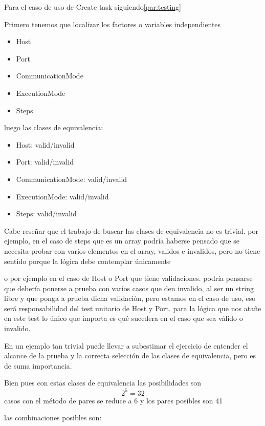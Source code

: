 Para el caso de uso de Create task siguiendo\ref{par:testing}

Primero tenemos que localizar los factores o variables independientes

\begin{itemize}
    \item Host
    \item Port
    \item CommunicationMode
    \item ExecutionMode
    \item Steps
\end{itemize}

luego las clases de equivalencia:

\begin{itemize}
    \item Host: valid/invalid
    \item Port: valid/invalid
    \item CommunicationMode: valid/invalid
    \item ExecutionMode: valid/invalid
    \item Steps: valid/invalid
\end{itemize}

Cabe reseñar que el trabajo de buscar las clases de equivalencia no es trivial. por ejemplo, en el caso de steps que es un array podría haberse pensado que se necesita probar con varios elementos en el array, validos e invalidos, pero no tiene sentido porque la lógica debe contemplar únicamente

o por ejemplo en el caso de Host o Port que tiene validaciones. podría pensarse que debería ponerse a prueba con varios casos que den invalido, al ser un string libre y que ponga a prueba dicha validación, pero estamos en el caso de uso, eso será responsabilidad del test unitario de Host y Port. para la lógica que nos atañe en este test lo único que importa es qué sucedera en el caso que sea válido o invalido.

En un ejemplo tan trivial puede llevar a subestimar el ejercicio de entender el alcance de la prueba y la correcta selección de las clases de equivalencia, pero es de suma importancia.

Bien pues con estas clases de equivalencia las posibilidades son \[ 2^5 = 32 \] casos con el método de pares se reduce a 6 y los pares posibles son 41

las combinaciones posibles son:

